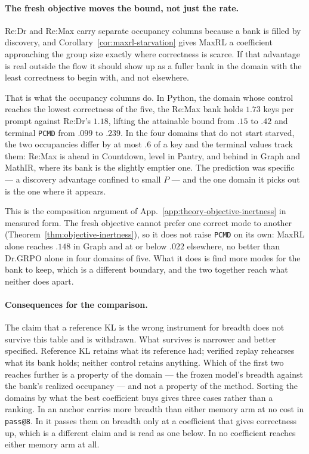 \documentclass{article}
\newcommand{\1}{\mathbf 1}
\newcommand{\pmd}{\texttt{PCMD}}
\theoremstyle{remark}
\theoremstyle{definition}
\theoremstyle{plain}
\begin{document}
\paragraph{The fresh objective moves the bound, not just the rate.}
Re:Dr and Re:Max carry separate occupancy columns because a bank is filled by
discovery, and Corollary~\ref{cor:maxrl-starvation} gives MaxRL a coefficient
approaching the group size exactly where correctness is scarce. If that
advantage is real outside the flow it should show up as a fuller bank in the
domain with the least correctness to begin with, and not elsewhere.

That is what the occupancy columns do. In Python, the domain whose control
reaches the lowest correctness of the five, the Re:Max bank holds $1.73$ keys
per prompt against Re:Dr's $1.18$, lifting the attainable bound from $.15$ to
$.42$ and terminal \pmd{} from $.099$ to $.239$. In the four domains that do
not start starved, the two occupancies differ by at most $.6$ of a key and the
terminal values track them: Re:Max is ahead in Countdown, level in Pantry, and
behind in Graph and MathIR, where its bank is the slightly emptier one. The
prediction was specific --- a discovery advantage confined to small $P$ --- and
the one domain it picks out is the one where it appears.

This is the composition argument of App.~\ref{app:theory-objective-inertness}
in measured form. The fresh objective cannot prefer one correct mode to another
(Theorem~\ref{thm:objective-inertness}), so it does not raise \pmd{} on its own:
MaxRL alone reaches $.148$ in Graph and at or below $.022$ elsewhere, no better
than Dr.GRPO alone in four domains of five. What it does is find more modes for
the bank to keep, which is a different boundary, and the two together reach
what neither does apart.

\paragraph{Consequences for the comparison.}
The claim that a reference KL is the wrong instrument for breadth does not
survive this table and is withdrawn. What survives is narrower and better
specified. Reference KL retains what its reference had; verified replay
rehearses what its bank holds; neither control retains anything. Which of the
first two reaches further is a property of the domain --- the frozen model's
breadth against the bank's realized occupancy --- and not a property of the
method. Sorting the domains by what the best coefficient buys gives three
cases rather than a ranking. In \MDklFreeNames{} an anchor carries more breadth
than either memory arm at no cost in \texttt{pass@8}. In \MDklPricedNames{} it
passes them on breadth only at a coefficient that gives correctness up, which
is a different claim and is read as one below. In \MDklMemoryNames{} no
coefficient reaches either memory arm at all.
\end{document}
